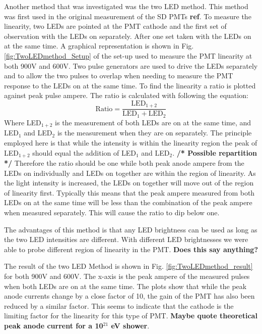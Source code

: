 Another method that was investigated was the two LED method. This method was first used in the original measurement of the SD PMTs \textbf{ref}. To measure the linearity, two LEDs are pointed at the PMT cathode and the first set of observation with the LEDs on separately. After one set taken with the LEDs on at the same time. A graphical representation is shown in Fig. \ref{fig:TwoLEDmethod_Setup} of the set-up used to measure the PMT linearity at both 900V and 600V. Two pulse generators are used to drive the LEDs separately and to allow the two pulses to overlap when needing to measure the PMT response to the LEDs on at the same time. To find the linearity a ratio is plotted against peak pulse ampere. The ratio is calculated with following the equation:
\begin{equation}
\mathrm{Ratio} = \frac{\mathrm{LED}_{1+2}}{\mathrm{LED}_{1} + \mathrm{LED}_{2}}
\end{equation}
Where LED$_{1+2}$ is the measurement of both LEDs are on at the same time, and LED$_{1}$ and LED$_2$ is the measurement when they are on separately. The principle employed here is that while the intensity is within the linearity region the peak of LED$_{1+2}$ should equal the addition of LED$_{1}$ and LED$_2$. \textbf{/* Possible repartition */} Therefore the ratio should be one while both peak anode ampere from the LEDs on individually and LEDs on together are within the region of linearity. As the light intensity is increased, the LEDs on together will move out of the region of linearity first. Typically this means that the peak ampere measured from both LEDs on at the same time will be less than the combination of the peak ampere when measured separately. This will cause the ratio to dip below one.

The advantages of this method is that any LED brightness can be used as long as the two LED intensities are different. With different LED brightnesses we were able to probe different region of linearity in the PMT. \textbf{Does this say anything?}

The result of the two LED Method is shown in Fig. \ref{fig:TwoLEDmethod_result} for both 900V and 600V. The x-axis is the peak ampere of the measured pulses when both LEDs are on at the same time. The plots show that while the peak anode currents change by a close factor of 10, the gain of the PMT has also been reduced by a similar factor. This seems to indicate that the cathode is the limiting factor for the linearity for this type of PMT. \textbf{Maybe quote theoretical peak anode current for a 10$^{21}$ eV shower}.

